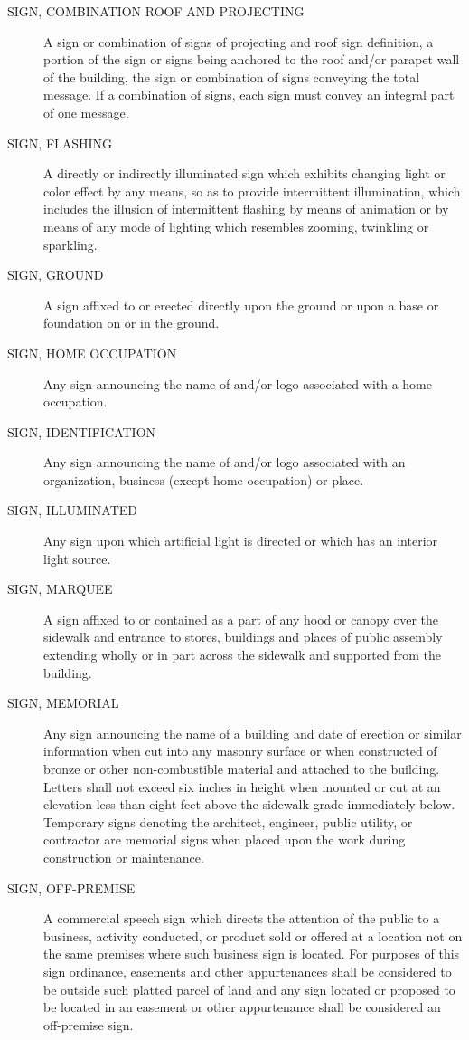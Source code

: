 \begin{description}
    \item[SIGN, COMBINATION ROOF AND PROJECTING] A sign or combination of signs of projecting and roof sign definition, a portion of the sign or signs being anchored to the roof and/or parapet wall of the building, the sign or combination of signs conveying the total message.  If a combination of signs, each sign must convey an integral part of one message.
    \item[SIGN, FLASHING] A directly or indirectly illuminated sign which exhibits changing light or color effect by any means, so as to provide intermittent illumination, which includes the illusion of intermittent flashing by means of animation or by means of any mode of lighting which resembles zooming, twinkling or sparkling.
    \item[SIGN, GROUND] A sign affixed to or erected directly upon the ground or upon a base or foundation on or in the ground.
    \item[SIGN, HOME OCCUPATION] Any sign announcing the name of and/or logo associated with a home occupation.
    \item[SIGN, IDENTIFICATION] Any sign announcing the name of and/or logo associated with an organization, business (except home occupation) or place.
    \item[SIGN, ILLUMINATED] Any sign upon which artificial light is directed or which has an interior light source.
    \item[SIGN, MARQUEE] A sign affixed to or contained as a part of any hood or canopy over the sidewalk and entrance to stores, buildings and places of public assembly extending wholly or in part across the sidewalk and supported from the building.
    \item[SIGN, MEMORIAL] Any sign announcing the name of a building and date of erection or similar information when cut into any masonry surface or when constructed of bronze or other non-combustible material and attached to the building.  Letters shall not exceed six inches in height when mounted or cut at an elevation less than eight feet above the sidewalk grade immediately below.  Temporary signs denoting the architect, engineer, public utility, or contractor are memorial signs when placed upon the work during construction or maintenance.
    \item[SIGN, OFF-PREMISE] A commercial speech sign which directs the attention of the public to a business, activity conducted, or product sold or offered at a location not on the same premises where such business sign is located.  For purposes of this sign ordinance, easements and other appurtenances shall be considered to be outside such platted parcel of land and any sign located or proposed to be located in an easement or other appurtenance shall be considered an off-premise sign.

\end{description}
